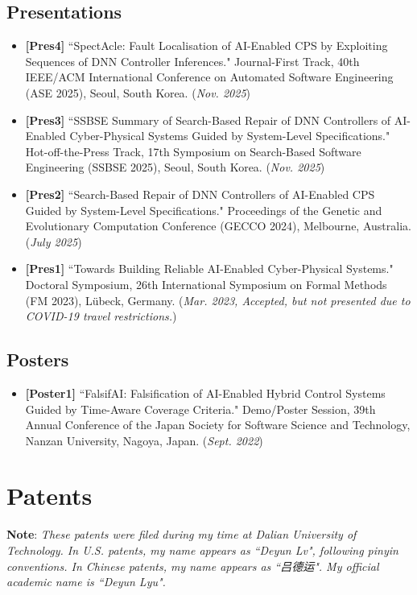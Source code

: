 \documentclass[11pt,a4paper]{moderncv}        %
\begin{document}
\subsection{Presentations}

\begin{itemize}
    \item \textbf{[Pres4]} ``SpectAcle: Fault Localisation of AI-Enabled CPS by Exploiting Sequences of DNN Controller Inferences." Journal-First Track, 40th IEEE/ACM International Conference on Automated Software Engineering (ASE 2025), Seoul, South Korea. (\textit{Nov. 2025})
    \item \textbf{[Pres3]} ``SSBSE Summary of Search-Based Repair of DNN Controllers of AI-Enabled Cyber-Physical Systems Guided by System-Level Specifications."  Hot-off-the-Press Track, 17th Symposium on Search-Based Software Engineering (SSBSE 2025), Seoul, South Korea. (\textit{Nov. 2025})
    \item \textbf{[Pres2]} ``Search-Based Repair of DNN Controllers of AI-Enabled CPS Guided by System-Level Specifications." Proceedings of the Genetic and Evolutionary Computation Conference (GECCO 2024), Melbourne, Australia. (\textit{July 2025})
    \item \textbf{[Pres1]} ``Towards Building Reliable AI-Enabled Cyber-Physical Systems." Doctoral Symposium, 26th International Symposium on Formal Methods (FM 2023), Lübeck, Germany. (\textit{Mar. 2023, Accepted, but not presented due to COVID-19 travel restrictions.})
\end{itemize}

\subsection{Posters}

\begin{itemize}
    \item \textbf{[Poster1]} ``FalsifAI: Falsification of AI-Enabled Hybrid Control Systems Guided by Time-Aware Coverage Criteria." Demo/Poster Session, 39th Annual Conference of the Japan Society for Software Science and Technology, Nanzan University, Nagoya, Japan. (\textit{Sept. 2022})
\end{itemize}

\section{Patents}
\hypertarget{sec:patents}{}
\noindent \textbf{Note}: \textit{These patents were filed during my time at Dalian University of Technology. In U.S. patents, my name appears as ``Deyun Lv", following pinyin conventions. In Chinese patents, my name appears as ``吕德运". My official academic name is ``Deyun Lyu".}
\end{document}
